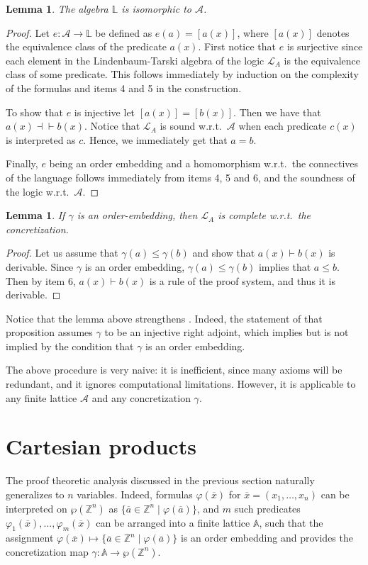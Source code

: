 \documentclass[11pt]{article}
\theoremstyle{plain}
\newtheorem{lem}[thm]{Lemma}
\newtheorem{lemma}[thm]{Lemma}
\theoremstyle{definition}
\begin{document}
\begin{lemma}
	The algebra $\mathbb{L}$ is isomorphic to $\mathcal{A}$.
\end{lemma}
\begin{proof}
	Let $e:\mathcal{A}\to\mathbb{L}$ be defined as $e(a)=[a(x)]$, where $[a(x)]$ denotes the equivalence class of the predicate $a(x)$. First notice that $e$ is surjective since each element in the Lindenbaum-Tarski algebra of the logic $\mathcal{L}_A$ is  the equivalence class of some predicate. This follows immediately by induction on the complexity of the formulas and items 4 and 5 in the construction.
	
	To show that $e$ is injective let $[a(x)]=[b(x)]$. Then we have that $a(x)\dashv\vdash b(x)$. Notice that $\mathcal{L}_A$ is sound w.r.t.\ $\mathcal{A}$ when each predicate $c(x)$ is interpreted as $c$. Hence, we immediately get that $a=b$.
	
	Finally, $e$ being an order embedding and a homomorphism w.r.t.\ the connectives of the language follows immediately from items 4, 5 and 6, and the soundness of the logic w.r.t.\ $\mathcal{A}$.
\end{proof}

\begin{lem}
	If $\gamma$ is an order-embedding, then $\mathcal{L}_A$ is complete w.r.t.\ the concretization. 
\end{lem}
\begin{proof}
	Let us assume that $\gamma(a)\leq\gamma(b)$ and show that $a(x)\vdash b(x)$ is derivable. Since $\gamma$ is an order embedding, $\gamma(a)\leq\gamma(b)$ implies  that $a\leq b$. Then by item 6, $a(x)\vdash b(x)$ is a rule of the proof system, and thus it is derivable.
\end{proof}

Notice that the lemma above strengthens  \cite[Proposition 5]{schmidt2008internal}. Indeed, the statement of that proposition  assumes  $\gamma$ to be an injective  right adjoint, which implies but is not implied by the condition that $\gamma$ is an order embedding.

The above procedure is very naive: it is  inefficient, since many axioms will be redundant, and it ignores computational limitations. However, it is applicable to any finite lattice $\mathcal{A}$ and any concretization $\gamma$. 





\section{Cartesian products}
The proof theoretic analysis  discussed in the previous section naturally generalizes to $n$ variables. Indeed,  formulas $\varphi(\overline{x})$ for $\overline{x}=(x_1,\ldots, x_n)$ can be interpreted on $\wp(\mathbb{Z}^n)$ as $\{\overline{a}\in\mathbb{Z}^n\mid \varphi(\overline{a})\}$, and  $m$ such predicates $\varphi_1(\overline{x}),\ldots,\varphi_m(\overline{x})$  can be arranged into a finite lattice $\mathbb{A}$, such that the assignment $\varphi(\overline{x})\mapsto \{\overline{a}\in\mathbb{Z}^n\mid \varphi(\overline{a})\}$ is an order embedding and provides the concretization map $\gamma:\mathbb{A}\to\wp(\mathbb{Z}^n)$.
\end{document}
